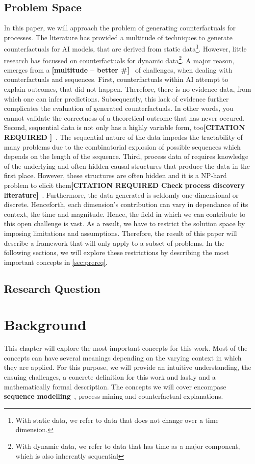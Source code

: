 \documentclass[12pt,a4paper,footinclude=true,headinclude=true]{report}
\newcommand{\attention}[1]{\color{red}\textbf{[#1]}\color{black}~}
\newcommand{\needscite}[1]{\color{red}\textbf{[CITATION REQUIRED #1]}\color{black}~}
\newcommand{\optional}[1]{\color{blue}\textbf{#1}\color{black}~}
\begin{document}
\section{Problem Space}
In this paper, we will approach the problem of generating counterfactuals for processes. The literature has provided a multitude of techniques to generate counterfactuals for AI models, that are derived from static data\footnote{With static data, we refer to data that does not change over a time dimension.}. However, little research has focussed on counterfactuals for dynamic data\footnote{With dynamic data, we refer to data that has time as a major component, which is also inherently sequential}. A major reason, emerges from a \attention{multitude -- better \#} of challenges, when dealing with counterfactuals and sequences.
First, counterfactuals within AI attempt to explain outcomes, that did not happen. Therefore, there is no evidence data, from which one can infer predictions. Subsequently, this lack of evidence further complicates the evaluation of generated counterfactuals. In other words, you cannot validate the correctness of a theoretical outcome that has never occured.
Second, sequential data is not only has a highly variable form, too\needscite{}. The sequential nature of the data impedes the tractability of many problems due to the combinatorial explosion of possible sequences which depends on the length of the sequence.
Third, process data of requires knowledge of the underlying and often hidden causal structures that produce the data in the first place. However, these structures are often hidden and it is a NP-hard problem to elicit them\needscite{Check process discovery literature}. Furthermore, the data generated is seldomly one-dimensional or discrete. Henceforth, each dimension's contribution can vary in dependance of its context, the time and magnitude.
Hence, the field in which we can contribute to this open challenge is vast. As a result, we have to restrict the solution space by imposing limitations and assumptions. Therefore, the result of this paper will describe a framework that will only apply to a subset of problems. In the following sections, we will explore these restrictions by describing the most important concepts in \autoref{sec:prereq}.
\section{Research Question}

\chapter{Background}
\label{sec:prereq}
This chapter will explore the most important concepts for this work. Most of the concepts can have several meanings depending on the varying context in which they are applied. For this purpose, we will provide an intuitive understanding, the ensuing challenges, a concrete definition for this work and lastly and a mathematically formal description. The concepts we will cover encompase \optional{sequence modelling}, process mining and counterfactual explanations.
\end{document}
